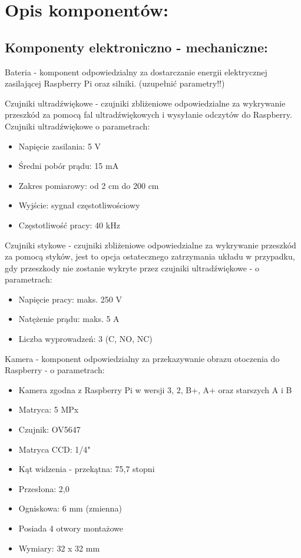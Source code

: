 \documentclass[a4paper]{article}
\begin{document}
\section{Opis komponentów:}

\subsection{Komponenty elektroniczno - mechaniczne:}


Bateria - komponent odpowiedzialny za dostarczanie energii elektrycznej zasilającej Raspberry Pi oraz silniki. (uzupełnić parametry!!)


Czujniki ultradźwiękowe - czujniki zbliżeniowe odpowiedzialne za wykrywanie przeszkód za pomocą fal ultradźwiękowych i wysyłanie odczytów do Raspberry. Czujniki ultradźwiękowe o parametrach:
\begin{itemize}
\item Napięcie zasilania: 5 V
\item Średni pobór prądu: 15 mA
\item Zakres pomiarowy: od 2 cm do 200 cm
\item Wyjście: sygnał częstotliwościowy
\item Częstotliwość pracy: 40 kHz
\end{itemize}
Czujniki stykowe - czujniki zbliżeniowe odpowiedzialne za wykrywanie przeszkód za pomocą styków, jest to opcja ostatecznego zatrzymania układu w przypadku, gdy przeszkody nie zostanie wykryte przez czujniki ultradźwiękowe - o parametrach:
\begin{itemize}
\item Napięcie pracy: maks. 250 V
\item Natężenie prądu: maks. 5 A
\item Liczba wyprowadzeń: 3 (C, NO, NC)
\end{itemize}
Kamera - komponent odpowiedzialny za przekazywanie obrazu otoczenia do Raspberry - o parametrach:
\begin{itemize}
\item Kamera zgodna z Raspberry Pi w wersji 3, 2, B+, A+ oraz starszych A i B
\item Matryca: 5 MPx
\item Czujnik: OV5647
\item Matryca CCD: 1/4"
\item Kąt widzenia - przekątna: 75,7 stopni
\item Przesłona: 2,0
\item Ogniskowa: 6 mm (zmienna)
\item Posiada 4 otwory montażowe
\item Wymiary: 32 x 32 mm
\end{itemize}
\end{document}
